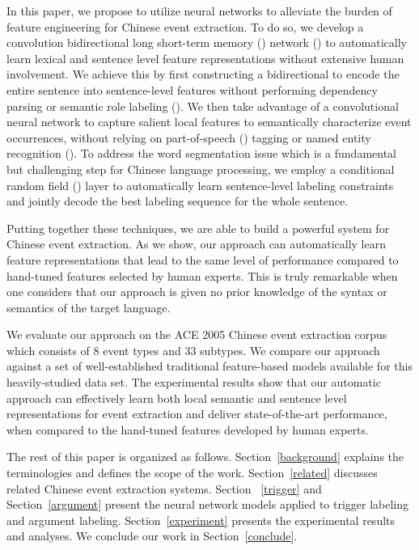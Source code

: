 In this paper, we propose to utilize neural networks to alleviate the burden of feature
engineering for Chinese event extraction. To do so, we develop a convolution bidirectional long short-term memory
(\LSTM) network (\CBiLSTM) to automatically learn lexical and sentence level feature representations without extensive human
involvement. We achieve this by first constructing a bidirectional \LSTM to encode the entire sentence into
sentence-level features without performing dependency parsing or semantic role labeling (\SRL). %
We then take advantage of a convolutional neural network to capture salient local features
to semantically characterize event occurrences, %
without relying on part-of-speech (\POS) tagging or named entity
recognition (\NER). %
To address the word segmentation issue which is a fundamental but challenging step for Chinese language processing, we employ a conditional
random field (\CRF) layer to automatically learn sentence-level labeling constraints and jointly decode the best labeling sequence for the
whole sentence.

Putting together these techniques, we are able to build a powerful
system for Chinese event extraction. As we show, our approach can
automatically learn feature representations that lead to the same level of performance compared to hand-tuned features selected by %
human experts. This is truly remarkable when one considers that our approach is given no prior knowledge of
the syntax or semantics of the target language. %

We evaluate our approach on the ACE 2005 Chinese event extraction corpus which consists of 8 event types and 33 subtypes.
We compare our approach against a set of well-established traditional feature-based models available for this heavily-studied data set.
The experimental results show that our automatic approach can effectively learn both local semantic and sentence level
representations for event extraction and deliver state-of-the-art performance, when compared to
the hand-tuned features developed by human experts.


The rest of this paper is organized as follows. Section~\ref{background} explains the terminologies and defines the
scope of the work. Section~\ref{related} discusses related Chinese event extraction systems. Section ~\ref{trigger} and
Section~\ref{argument} present the neural network models applied to trigger labeling and argument labeling.
Section~\ref{experiment} presents the experimental results and analyses. We conclude our work in
Section~\ref{conclude}.
